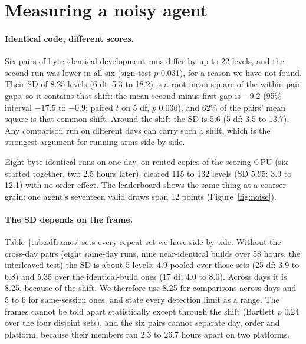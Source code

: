 \section{Measuring a noisy agent}\label{sec:measure}

\paragraph{Identical code, different scores.}
Six pairs of byte-identical development runs differ by up to 22 levels, and the second run was lower in all six (sign test $p$ 0.031), for a reason we have not found. %
Their SD of 8.25 levels (6 df; 5.3 to 18.2) is a root mean square of the within-pair gaps, so it contains that shift: the mean second-minus-first gap is $-9.2$ (95\% interval $-17.5$ to $-0.9$; paired $t$ on 5 df, $p$ 0.036), and 62\% of the pairs' mean square is that common shift. Around the shift the SD is 5.6 (5 df; 3.5 to 13.7). %
Any comparison run on different days can carry such a shift, which is the strongest argument for running arms side by side.

Eight byte-identical runs on one day, on rented copies of the scoring GPU (six started together, two 2.5 hours later), cleared 115 to 132 levels (SD 5.95; 3.9 to 12.1) with no order effect. %
The leaderboard shows the same thing at a coarser grain: one agent's seventeen valid draws span 12 points (Figure~\ref{fig:noise}). %

\paragraph{The SD depends on the frame.}
Table~\ref{tab:sdframes} sets every repeat set we have side by side. Without the cross-day pairs (eight same-day runs, nine near-identical builds over 58 hours, the interleaved test) the SD is about 5 levels: 4.9 pooled over those sets (25 df; 3.9 to 6.8) and 5.35 over the identical-build ones (17 df; 4.0 to 8.0). Across days it is 8.25, because of the shift. %
We therefore use 8.25 for comparisons across days and 5 to 6 for same-session ones, and state every detection limit as a range.
The frames cannot be told apart statistically except through the shift (Bartlett $p$ 0.24 over the four disjoint sets), and the six pairs cannot separate day, order and platform, because their members ran 2.3 to 26.7 hours apart on two platforms. %

